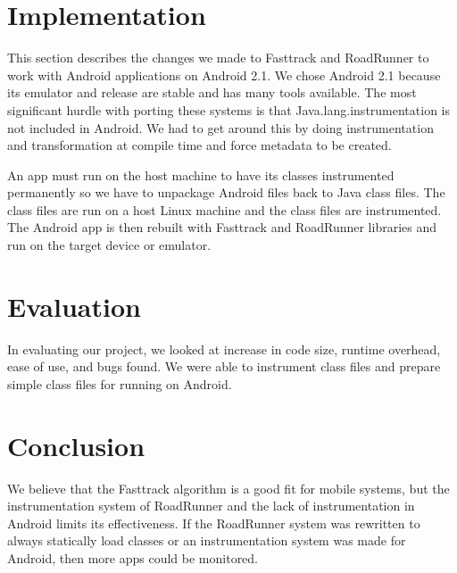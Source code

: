 \documentclass{acm_proc_article-sp}
\begin{document}
\section{Implementation}
This section describes the changes we made to Fasttrack and RoadRunner to work with Android applications on Android 2.1. We chose Android 2.1 because its emulator and release are stable and has many tools available. The most significant hurdle with porting these systems is that Java.lang.instrumentation is not included in Android. We had to get around this by doing instrumentation and transformation at compile time and force metadata to be created.

An app must run on the host machine to have its classes instrumented permanently so we have to unpackage Android files back to Java class files. The class files are run on a host Linux machine and the class files are instrumented. The Android app is then rebuilt with Fasttrack and RoadRunner libraries and run on the target device or emulator.   

\section{Evaluation}
In evaluating our project, we looked at increase in code size, runtime overhead, ease of use, and bugs found. We were able to instrument class files and prepare simple class files for running on Android.

\section{Conclusion}
We believe that the Fasttrack algorithm is a good fit for mobile systems, but the instrumentation system of RoadRunner and the lack of instrumentation in Android limits its effectiveness. If the RoadRunner system was rewritten to always statically load classes or an instrumentation system was made for Android, then more apps could be monitored.



\end{document}
